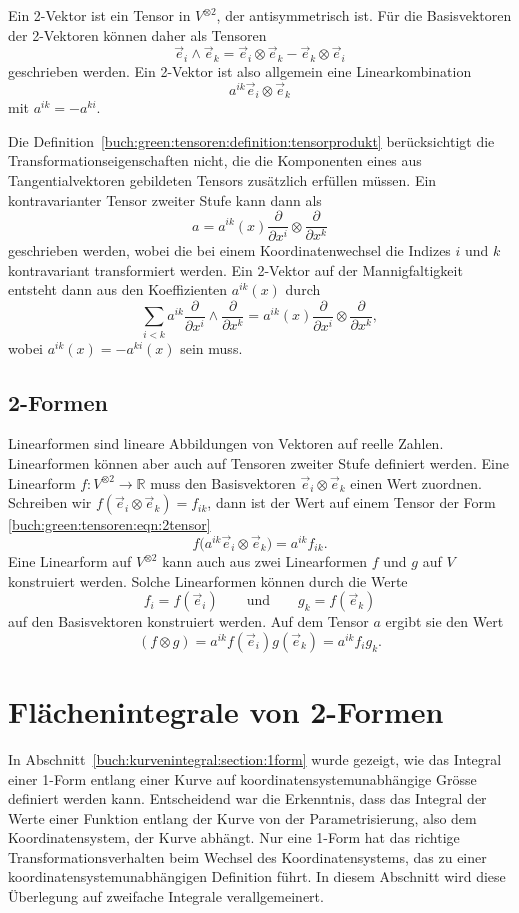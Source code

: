 Ein 2-Vektor ist ein Tensor in $V^{\otimes 2}$, der antisymmetrisch ist.
Für die Basisvektoren der 2-Vektoren können daher als Tensoren
\[
\vec{e}_i\wedge\vec{e}_k
=
\vec{e}_i\otimes\vec{e}_k
-
\vec{e}_k\otimes\vec{e}_i
\]
geschrieben werden.
Ein 2-Vektor ist also allgemein eine Linearkombination
\begin{equation}
a^{ik}\vec{e}_i\otimes\vec{e}_k
\label{buch:green:tensoren:eqn:2tensor}
\end{equation}
mit $a^{ik}=-a^{ki}$.

Die Definition~\ref{buch:green:tensoren:definition:tensorprodukt}
berücksichtigt die Transformationseigenschaften nicht,
die die Komponenten eines aus Tangentialvektoren gebildeten
Tensors zusätzlich erfüllen müssen.
Ein kontravarianter Tensor zweiter Stufe kann dann als
\[
a
=
a^{ik}(x) \frac{\partial}{\partial x^i}\otimes\frac{\partial}{\partial x^k}
\]
geschrieben werden, wobei die bei einem Koordinatenwechsel die
Indizes $i$ und $k$ kontravariant transformiert werden.
Ein 2-Vektor auf der Mannigfaltigkeit entsteht dann aus den Koeffizienten
$a^{ik}(x)$ durch
\[
\sum_{i<k}
a^{ik}
\frac{\partial}{\partial x^i}
\wedge
\frac{\partial}{\partial x^k}
=
a^{ik}(x)
\frac{\partial}{\partial x^i}
\otimes
\frac{\partial}{\partial x^k},
\]
wobei $a^{ik}(x)=-a^{ki}(x)$ sein muss.

%
%
\subsection{2-Formen}
Linearformen sind lineare Abbildungen von Vektoren auf reelle Zahlen.
Linearformen können aber auch auf Tensoren zweiter Stufe definiert werden.
Eine Linearform $f\colon V^{\otimes 2}\to\mathbb{R}$ muss den Basisvektoren
$\vec{e}_i\otimes\vec{e}_k$ einen Wert zuordnen.
Schreiben wir $f(\vec{e}_i\otimes\vec{e}_k)=f_{ik}$, dann ist der Wert
auf einem Tensor der Form
\eqref{buch:green:tensoren:eqn:2tensor}
\[
f\bigl(
a^{ik}\vec{e}_i\otimes \vec{e}_k
\bigr)
=
a^{ik}
f_{ik}.
\]
Eine Linearform auf $V^{\otimes 2}$ kann auch aus zwei Linearformen
$f$ und $g$ auf $V$ konstruiert werden.
Solche Linearformen können durch die Werte
\[
f_i = f(\vec{e}_i) 
\qquad\text{und}\qquad
g_k = f(\vec{e}_k)
\]
auf den Basisvektoren konstruiert werden.
Auf dem Tensor $a$ ergibt sie den Wert
\[
(f\otimes g)
=
a^{ik}f(\vec{e}_i)g(\vec{e}_k)
=
a^{ik}f_ig_k.
\]


%
%
\section{Flächenintegrale von 2-Formen
\label{buch:green:section:integral}}
In Abschnitt~\ref{buch:kurvenintegral:section:1form} wurde gezeigt,
wie das Integral einer 1-Form entlang einer Kurve auf
koordinatensystemunabhängige Grösse definiert werden kann.
Entscheidend war die Erkenntnis, dass das Integral der Werte einer
Funktion entlang der Kurve von der Parametrisierung, also dem
Koordinatensystem, der Kurve abhängt.
Nur eine 1-Form hat das richtige Transformationsverhalten beim
Wechsel des Koordinatensystems, das zu einer koordinatensystemunabhängigen
Definition führt.
In diesem Abschnitt wird diese Überlegung auf zweifache Integrale
verallgemeinert.

